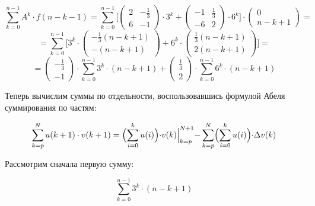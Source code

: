 \begin{displaymath}
\sum_{k=0}^{n-1} A^k \cdot f(n-k-1) = \sum_{k=0}^{n-1} \Big [ \begin{pmatrix}
2 & - \frac{1}{3}
\\
6 & -1

\end{pmatrix} \cdot 3^k + \begin{pmatrix}
-1 & \frac{1}{3}
\\
-6 & 2
\end{pmatrix} \cdot 6^k \Big ] \cdot \begin{pmatrix}
0
\\
n-k+1
\end{pmatrix} = 
\end{displaymath}
\begin{displaymath}
= \sum_{k=0}^{n-1} \Big [ 3^k \cdot \begin{pmatrix}
- \frac{1}{3} (n-k+1)
\\
- (n-k+1)
\end{pmatrix} + 6^k \cdot \begin{pmatrix}
\frac{1}{3} (n-k+1)
\\
2 (n-k+1)
\end{pmatrix} \Big ] = 
\end{displaymath}
\begin{displaymath}
= \begin{pmatrix}
- \frac{1}{3}
\\
- 1
\end{pmatrix} \cdot \sum_{k=0}^{n-1} 3^k \cdot (n-k+1)  + \begin{pmatrix}
\frac{1}{3}
\\
2 
\end{pmatrix} \cdot  \sum_{k=0}^{n-1} 6^k \cdot (n-k+1)
\end{displaymath}

Теперь вычислим суммы по отдельности, воспользовавшись формулой Абеля суммирования по частям:

\begin{displaymath}
\sum_{k=p}^{N} u(k+1) \cdot v(k+1) = \Bigl ( \sum_{i=0}^{k} u(i) \Bigl ) \cdot v(k) \Bigl |_{k=p}^{N+1} - \sum_{k=p}^{N} \Bigl ( \sum_{i=0}^{k} u(i) \Bigl ) \cdot \Delta v(k)
\end{displaymath}

Рассмотрим сначала первую сумму:

\begin{displaymath}
\sum_{k=0}^{n-1} 3^k \cdot (n-k+1)
\end{displaymath}

